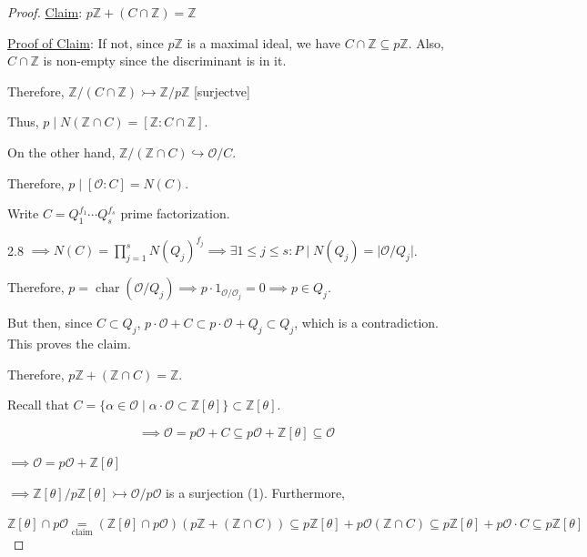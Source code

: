 \documentclass[openany]{amsbook}
\numberwithin{section}{chapter}
\theoremstyle{definition}
\begin{document}
\begin{proof}
    \underline{Claim}: \(p\mathbb{Z} + (C\cap \mathbb{Z}) = \mathbb{Z}\)
    
    \underline{Proof of Claim}: If not, since \(p\mathbb{Z}\) is a maximal ideal, we have \(C\cap \mathbb{Z} \subseteq p\mathbb{Z}\). Also, \(C\cap \mathbb{Z}\) is non-empty since the discriminant is in it.

    Therefore, \(\mathbb{Z} / (C\cap\mathbb{Z}) \rightarrowtail \mathbb{Z} / p\mathbb{Z}\) [surjectve]
    
    Thus, \(p \mid N(\mathbb{Z} \cap C) = [\mathbb{Z} : C\cap\mathbb{Z}]\).

    On the other hand, \(\mathbb{Z} / (\mathbb{Z} \cap C) \hookrightarrow \mathcal{O} / C\). 

    Therefore, \(p \mid [\mathcal{O} : C] = N(C)\). 

    Write \(C = Q_1^{f_1}\cdots Q_s^{f_s}\) prime factorization. 

    2.8 \(\implies N(C) = \prod_{j=1}^{s} N(Q_j)^{f_j} \implies \exists 1 \leq j \leq s : P \mid N(Q_j) = \vert \mathcal{O} / Q_j \vert\).

    Therefore, \(p = \operatorname{char} (\mathcal{O} / Q_j) \implies p\cdot 1_{\mathcal{O} / \mathcal{O}_j} = 0 \implies p\in Q_j\).

    But then, since \(C \subset Q_j\), \(p\cdot \mathcal{O} + C \subset p \cdot \mathcal{O} + Q_j \subset Q_j\), which is a contradiction. This proves the claim.

    Therefore, \(p\mathbb{Z} + (\mathbb{Z} \cap C) = \mathbb{Z}\).

    Recall that \(C = \{ \alpha \in \mathcal{O} \mid \alpha \cdot \mathcal{O} \subset \mathbb{Z} [\theta] \} \subset \mathbb{Z} [\theta]\).

    \[
        \implies \mathcal{O}  = p\mathcal{O} + C \subseteq p \mathcal{O}  + \mathbb{Z} [\theta] \subseteq \mathcal{O}
    \]

    \(\implies \mathcal{O} = p \mathcal{O} + \mathbb{Z} [\theta]\) 
    
    \(\implies \mathbb{Z} [\theta] / p \mathbb{Z} [\theta] \rightarrowtail \mathcal{O} / p 
    \mathcal{O}\) is a surjection (1). Furthermore,

    \(\mathbb{Z} [\theta] \cap p \mathcal{O} \underset{\text{claim}}{=} (\mathbb{Z} [\theta]\cap p \mathcal{O}) (p\mathbb{Z} +(\mathbb{Z} \cap C)) \subseteq p \mathbb{Z} [\theta] + p \mathcal{O} (\mathbb{Z} \cap C) \subseteq p\mathbb{Z} [\theta] + p \mathcal{O} \cdot C \subseteq p\mathbb{Z}[\theta]\) 


\end{proof}
\end{document}
